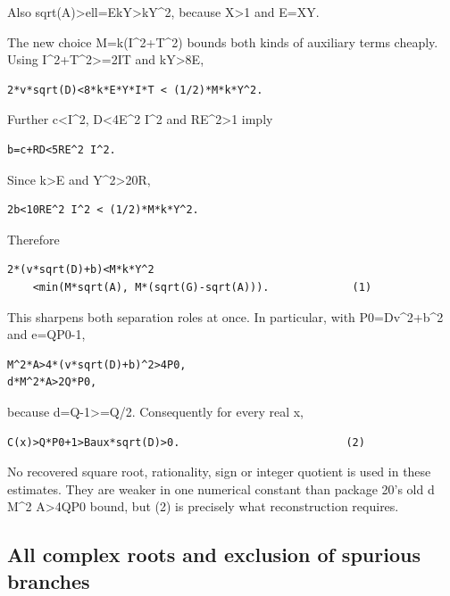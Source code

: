 \documentclass[
  10pt,
]{article}
\begin{document}
Also sqrt(A)\textgreater ell=EkY\textgreater kY\^{}2, because
X\textgreater1 and E=XY.

The new choice M=k(I\^{}2+T\^{}2) bounds both kinds of auxiliary terms
cheaply. Using I\^{}2+T\^{}2\textgreater=2IT and kY\textgreater8E,

\begin{verbatim}
2*v*sqrt(D)<8*k*E*Y*I*T < (1/2)*M*k*Y^2.
\end{verbatim}

Further c\textless I\^{}2, D\textless4E\^{}2 I\^{}2 and
RE\^{}2\textgreater1 imply

\begin{verbatim}
b=c+RD<5RE^2 I^2.
\end{verbatim}

Since k\textgreater E and Y\^{}2\textgreater20R,

\begin{verbatim}
2b<10RE^2 I^2 < (1/2)*M*k*Y^2.
\end{verbatim}

Therefore

\begin{verbatim}
2*(v*sqrt(D)+b)<M*k*Y^2
    <min(M*sqrt(A), M*(sqrt(G)-sqrt(A))).             (1)
\end{verbatim}

This sharpens both separation roles at once. In particular, with
P0=Dv\^{}2+b\^{}2 and e=QP0-1,

\begin{verbatim}
M^2*A>4*(v*sqrt(D)+b)^2>4P0,
d*M^2*A>2Q*P0,
\end{verbatim}

because d=Q-1\textgreater=Q/2. Consequently for every real x,

\begin{verbatim}
C(x)>Q*P0+1>Baux*sqrt(D)>0.                          (2)
\end{verbatim}

No recovered square root, rationality, sign or integer quotient is used
in these estimates. They are weaker in one numerical constant than
package 20's old d M\^{}2 A\textgreater4QP0 bound, but (2) is precisely
what reconstruction requires.

\subsection{All complex roots and exclusion of spurious
branches}\label{all-complex-roots-and-exclusion-of-spurious-branches}
\end{document}
